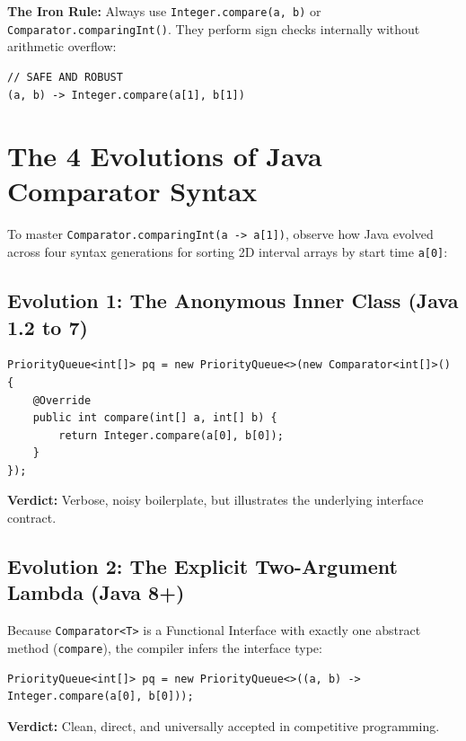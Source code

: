 \documentclass[10pt,journal,compsoc,onecolumn]{IEEEtran}
\begin{document}
\textbf{The Iron Rule:} Always use \texttt{Integer.compare(a, b)} or \texttt{Comparator.comparingInt()}. They perform sign checks internally without arithmetic overflow:
\begin{verbatim}
// SAFE AND ROBUST
(a, b) -> Integer.compare(a[1], b[1])
\end{verbatim}

\section{The 4 Evolutions of Java Comparator Syntax}
\label{sec:evolution}

To master \texttt{Comparator.comparingInt(a -> a[1])}, observe how Java evolved across four syntax generations for sorting 2D interval arrays by start time \texttt{a[0]}:

\subsection{Evolution 1: The Anonymous Inner Class (Java 1.2 to 7)}
\begin{verbatim}
PriorityQueue<int[]> pq = new PriorityQueue<>(new Comparator<int[]>() {
    @Override
    public int compare(int[] a, int[] b) {
        return Integer.compare(a[0], b[0]);
    }
});
\end{verbatim}
\textbf{Verdict:} Verbose, noisy boilerplate, but illustrates the underlying interface contract.

\subsection{Evolution 2: The Explicit Two-Argument Lambda (Java 8+)}
Because \texttt{Comparator<T>} is a Functional Interface with exactly one abstract method (\texttt{compare}), the compiler infers the interface type:
\begin{verbatim}
PriorityQueue<int[]> pq = new PriorityQueue<>((a, b) -> Integer.compare(a[0], b[0]));
\end{verbatim}
\textbf{Verdict:} Clean, direct, and universally accepted in competitive programming.
\end{document}

